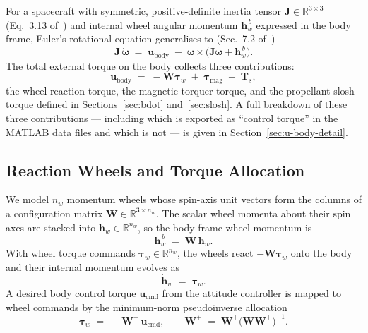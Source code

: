 For a spacecraft with symmetric, positive-definite inertia tensor
$\bm{J}\in\mathbb{R}^{3\times3}$ (Eq.~3.13 of~\cite{markley2014})
and internal wheel angular momentum $\bm{h}_w^{\,b}$ expressed in the body
frame, Euler's rotational equation generalises to (Sec.~7.2
of~\cite{markley2014})
\begin{equation}
\boxed{\;
\bm{J}\,\dot{\bm{\omega}}
\;=\;
\bm{u}_{\text{body}}
\;-\;
\bm{\omega}\times\!\bigl(\bm{J}\bm{\omega} + \bm{h}_w^{\,b}\bigr).
\;}
\label{eq:euler-wheels}
\end{equation}
The total external torque on the body collects three contributions:
\begin{equation}
\bm{u}_{\text{body}} \;=\; -\bm{W}\bm{\tau}_w \;+\; \bm{\tau}_{\text{mag}}
\;+\; \bm{T}_{\!s},
\label{eq:u-body-decomp}
\end{equation}
the wheel reaction torque, the magnetic-torquer torque, and the propellant
slosh torque defined in Sections~\ref{sec:bdot} and~\ref{sec:slosh}. A full
breakdown of these three contributions — including which is exported as
``control torque'' in the MATLAB data files and which is not — is given in
Section~\ref{sec:u-body-detail}.


\subsection{Reaction Wheels and Torque Allocation}
\label{sec:wheels}

We model $n_w$ momentum wheels whose spin-axis unit vectors form the
columns of a configuration matrix
$\bm{W}\in\mathbb{R}^{3\times n_w}$. The scalar wheel momenta about
their spin axes are stacked into $\bm{h}_w\in\mathbb{R}^{n_w}$, so the
body-frame wheel momentum is
\begin{equation}
\bm{h}_w^{\,b} \;=\; \bm{W}\,\bm{h}_w.
\end{equation}
With wheel torque commands $\bm{\tau}_w\in\mathbb{R}^{n_w}$, the wheels
react $-\bm{W}\bm{\tau}_w$ onto the body and their internal momentum
evolves as
\begin{equation}
\dot{\bm{h}}_w \;=\; \bm{\tau}_w.
\end{equation}
A desired body control torque $\bm{u}_{\text{cmd}}$ from the attitude
controller is mapped to wheel commands by the minimum-norm pseudoinverse
allocation
\begin{equation}
\bm{\tau}_w \;=\; -\bm{W}^{+}\,\bm{u}_{\text{cmd}},
\qquad
\bm{W}^{+} \;=\; \bm{W}^{\!\top}\!\bigl(\bm{W}\bm{W}^{\!\top}\bigr)^{-1}.
\label{eq:wheel-alloc}
\end{equation}

